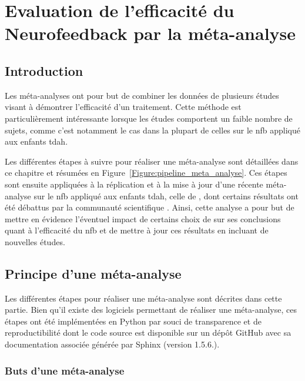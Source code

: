 \chapter{Evaluation de l'efficacité du Neurofeedback par la méta-analyse} \label{chapitre-2}

\section*{Introduction}
Les méta-analyses ont pour but de combiner les données de plusieurs études visant à démontrer l'efficacité d'un traitement. Cette méthode est
particulièrement intéressante lorsque les études comportent un faible nombre de sujets, comme c'est notamment le cas dans la plupart de celles sur 
le \gls{nfb} appliqué aux enfants \gls{tdah}.

Les différentes étapes à suivre pour réaliser une méta-analyse sont détaillées dans ce chapitre et résumées en Figure~\ref{Figure:pipeline_meta_analyse}.
Ces étapes sont ensuite appliquées à la réplication et à la mise à jour d'une récente méta-analyse sur le \gls{nfb} appliqué aux enfants \gls{tdah}, 
celle de \citet{Cortese2016}, dont certains résultats ont été débattus par la communauté scientifique \citep{Micoulaud2016}. Ainsi, cette analyse a pour but
de mettre en évidence l'éventuel impact de certains choix de \citet{Cortese2016} sur ses conclusions quant à l'efficacité du \gls{nfb} et de mettre à jour
ces résultats en incluant de nouvelles études.
\clearpage

\section{Principe d'une méta-analyse} \label{methods}

Les différentes étapes pour réaliser une méta-analyse sont décrites dans cette partie. Bien qu'il existe des logiciels permettant de réaliser une
méta-analyse, ces étapes ont été implémentées en Python par souci de transparence et de reproductibilité dont le code source est disponible sur un 
dépôt GitHub \citep{Bussalb2019clinical} avec sa documentation associée générée par Sphinx (version 1.5.6.).

\subsection{Buts d'une méta-analyse}

